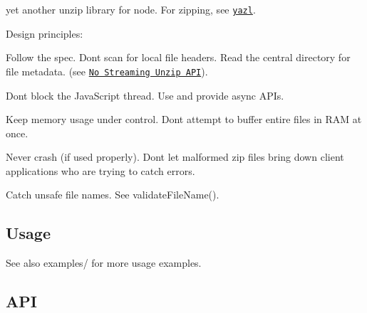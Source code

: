 \href{https://travis-ci.org/thejoshwolfe/yauzl}{\tt } \href{https://coveralls.io/r/thejoshwolfe/yauzl}{\tt }

yet another unzip library for node. For zipping, see \href{https://github.com/thejoshwolfe/yazl}{\tt yazl}.

Design principles\+:


\begin{DoxyItemize}
\item Follow the spec. Don\textquotesingle{}t scan for local file headers. Read the central directory for file metadata. (see \href{#no-streaming-unzip-api}{\tt No Streaming Unzip A\+PI}).
\item Don\textquotesingle{}t block the Java\+Script thread. Use and provide async A\+P\+Is.
\item Keep memory usage under control. Don\textquotesingle{}t attempt to buffer entire files in R\+AM at once.
\item Never crash (if used properly). Don\textquotesingle{}t let malformed zip files bring down client applications who are trying to catch errors.
\item Catch unsafe file names. See {\ttfamily validate\+File\+Name()}.
\end{DoxyItemize}

\subsection*{Usage}




See also {\ttfamily examples/} for more usage examples.

\subsection*{A\+PI}


